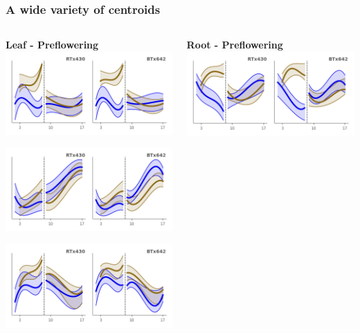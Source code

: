 \documentclass[xcolor=dvipsnames]{beamer}
\begin{document}
\begin{frame}
\frametitle{A wide variety of centroids}
\begin{columns}
\begin{column}{0.3\linewidth}
\center
\small
{\bf Leaf - Preflowering}
\includegraphics[width=0.9\linewidth]{figures/clusters/leaf_Preflowering_12.png}

\includegraphics[width=0.9\linewidth]{figures/clusters/leaf_Preflowering_17.png}

\includegraphics[width=0.9\linewidth]{figures/clusters/leaf_Preflowering_19.png}

\end{column}
\begin{column}{0.3\linewidth}
\center
\small
{\bf Root - Preflowering}
\includegraphics[width=0.9\linewidth]{figures/clusters/root_Preflowering_0.png}


\end{column}
\end{columns}
\end{frame}
\end{document}
